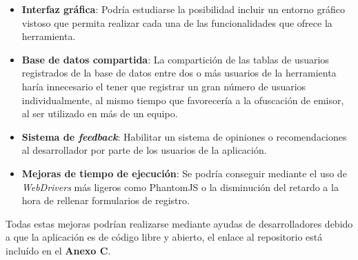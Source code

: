 \begin{itemize}
	\item \textbf{Interfaz gráfica}: Podría estudiarse la posibilidad incluir un entorno gráfico vistoso que permita realizar cada una de las funcionalidades que ofrece la herramienta.
	\item \textbf{Base de datos compartida}: La compartición de las tablas de usuarios registrados de la base de datos entre dos o más usuarios de la herramienta haría innecesario el tener que registrar un gran número de usuarios individualmente, al mismo tiempo que favorecería a la ofuscación de emisor, al ser utilizado en más de un equipo.
	\item \textbf{Sistema de \textit{feedback}}: Habilitar un sistema de opiniones o recomendaciones al desarrollador por parte de los usuarios de la aplicación.	
	\item \textbf{Mejoras de tiempo de ejecución}: Se podría conseguir mediante el uso de \textit{WebDrivers} más ligeros como PhantomJS o la disminución del retardo a la hora de rellenar formularios de registro.	
	
\end{itemize}


Todas estas mejoras podrían realizarse mediante ayudas de desarrolladores debido a que la aplicación es de código libre y abierto, el enlace al repositorio está incluído en el \textbf{Anexo C}.

\newpage \thispagestyle{empty} %